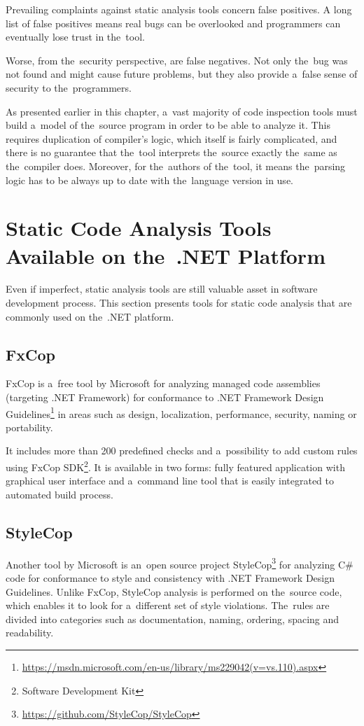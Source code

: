 \documentclass[
  digital, %
  table,   %
  lof,     %
  lot,     %
  oneside,
]{fithesis3}
\begin{document}
Prevailing complaints against static analysis tools concern false positives. A long list of false positives means real bugs can be overlooked and programmers can eventually lose trust in the~tool.

Worse, from the~security perspective, are false negatives. Not only the~bug was not found and might cause future problems, but they also provide a~false sense of security to the~programmers. 

As presented earlier in this chapter, a~vast majority of code inspection tools must build a~model of the~source program in order to be able to analyze it. This requires duplication of compiler's logic, which itself is fairly complicated, and there is no guarantee that the~tool interprets the~source exactly the~same as the~compiler does. Moreover, for the~authors of the~tool, it means the~parsing logic has to be always up to date with the~language version in use. 

\section{Static Code Analysis Tools Available on the~.NET Platform}
Even if imperfect, static analysis tools are still valuable asset in software development process. This section presents tools for static code analysis that are commonly used on the~.NET platform.

\subsection{FxCop}
FxCop is a~free tool by Microsoft for analyzing managed code assemblies (targeting .NET Framework) for conformance to .NET Framework Design Guidelines\footnote{\url{https://msdn.microsoft.com/en-us/library/ms229042(v=vs.110).aspx}} in areas such as design, localization, performance, security, naming or portability. 

It includes more than 200 predefined checks and a~possibility to add custom rules using FxCop SDK\footnote{Software Development Kit}. It is available in two forms: fully featured application with graphical user interface and a~command line tool that is easily integrated to automated build process. 

\subsection{StyleCop}
Another tool by Microsoft is an~open source project StyleCop\footnote{\url{https://github.com/StyleCop/StyleCop}} for analyzing C\# code for conformance to style and consistency with .NET Framework Design Guidelines. Unlike FxCop, StyleCop analysis is performed on the~source code, which enables it to look for a~different set of style violations. The~rules are divided into categories such as documentation, naming, ordering, spacing and readability. 
\end{document}
